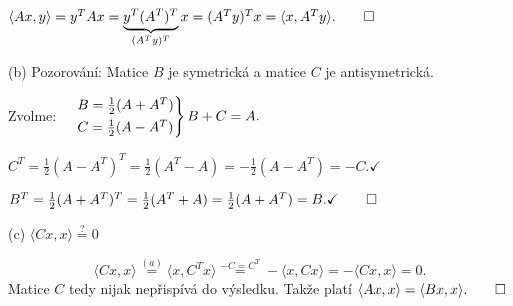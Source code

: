 $\langle Ax, y\rangle = y^T Ax = \underbrace{y^T (A^T)^T}_{(A^T y)^T} x = (A^T y)^T x = \langle x, A^T y\rangle. \qed$

(b) Pozorování: Matice $B$ je symetrická a matice $C$ je antisymetrická.

Zvolme:
$\begin{rcases}
    &B = \frac{1}{2} (A + A^T) \\
    &C = \frac{1}{2} (A - A^T)
\end{rcases}
B+C = A.$

$C^T = \frac{1}{2} (A-A^T)^T = \frac{1}{2} (A^T - A) = -\frac{1}{2} (A-A^T) = -C. \checkmark$

$B^T = \frac{1}{2} (A+A^T)^T = \frac{1}{2} (A^T + A) = \frac{1}{2} (A+A^T) = B. \checkmark \qed$


(c) $\langle C x, x\rangle \stackrel{?}{=} 0$

\[
    \langle Cx, x\rangle \stackrel{\hyperref[aExistence]{(a)}}{=} \langle x, C^T x\rangle \stackrel{-C = C^T}{=} 
    - \langle x, Cx\rangle = - \langle Cx, x\rangle = 0.
\]
Matice $C$ tedy nijak nepřispívá do výsledku. Takže platí $\langle Ax, x\rangle = \langle Bx, x\rangle. \qed$

